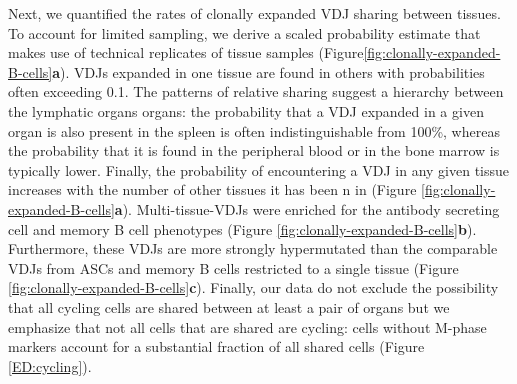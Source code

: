 Next, we quantified the rates of clonally expanded VDJ sharing between tissues. To account for limited sampling, we derive a scaled probability estimate that makes use of technical replicates of tissue samples (Figure\ref{fig:clonally-expanded-B-cells}\textbf{a}). VDJs expanded in one tissue are found in others with probabilities often exceeding 0.1. The patterns of relative sharing suggest a hierarchy between the lymphatic organs organs: the probability that a VDJ expanded in a given organ is also present in the spleen is often indistinguishable from 100\%, whereas the probability that it is found in the peripheral blood or in the bone marrow is typically lower. Finally, the probability of encountering a VDJ in any given tissue increases with the number of other tissues it has been n in (Figure \ref{fig:clonally-expanded-B-cells}\textbf{a}). Multi-tissue-VDJs were enriched for the antibody secreting cell and memory B cell phenotypes  (Figure \ref{fig:clonally-expanded-B-cells}\textbf{b}). Furthermore, these VDJs are more strongly hypermutated than the comparable VDJs from ASCs and memory B cells restricted to a single tissue (Figure \ref{fig:clonally-expanded-B-cells}\textbf{c}). Finally, our data do not exclude the possibility that all cycling cells are shared between at least a pair of organs but we emphasize that not all cells that are shared are cycling: cells without M-phase markers account for a substantial fraction of all shared cells (Figure \ref{ED:cycling}).


